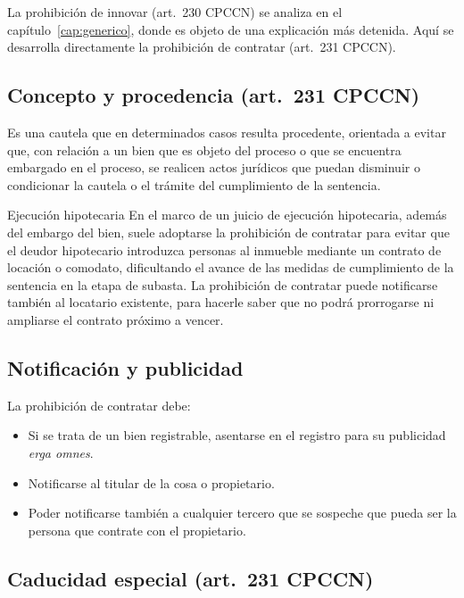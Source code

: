 \documentclass[12pt,oneside]{book}
\begin{document}
\begin{note}
La prohibición de innovar (art.\ 230 CPCCN) se analiza en el capítulo~\ref{cap:generico}, donde es objeto de una explicación más detenida. Aquí se desarrolla directamente la prohibición de contratar (art.\ 231 CPCCN).
\end{note}

\subsection{Concepto y procedencia (art.\ 231 CPCCN)}

Es una cautela que en determinados casos resulta procedente, orientada a evitar que, con relación a un bien que es objeto del proceso o que se encuentra embargado en el proceso, se realicen actos jurídicos que puedan disminuir o condicionar la cautela o el trámite del cumplimiento de la sentencia.

\begin{example}{Ejecución hipotecaria}
En el marco de un juicio de ejecución hipotecaria, además del embargo del bien, suele adoptarse la prohibición de contratar para evitar que el deudor hipotecario introduzca personas al inmueble mediante un contrato de locación o comodato, dificultando el avance de las medidas de cumplimiento de la sentencia en la etapa de subasta. La prohibición de contratar puede notificarse también al locatario existente, para hacerle saber que no podrá prorrogarse ni ampliarse el contrato próximo a vencer.
\end{example}

\subsection{Notificación y publicidad}

La prohibición de contratar debe:
\begin{itemize}
    \item Si se trata de un bien registrable, asentarse en el registro para su publicidad \textit{erga omnes}.
    \item Notificarse al titular de la cosa o propietario.
    \item Poder notificarse también a cualquier tercero que se sospeche que pueda ser la persona que contrate con el propietario.
\end{itemize}

\subsection{Caducidad especial (art.\ 231 CPCCN)}
\end{document}
